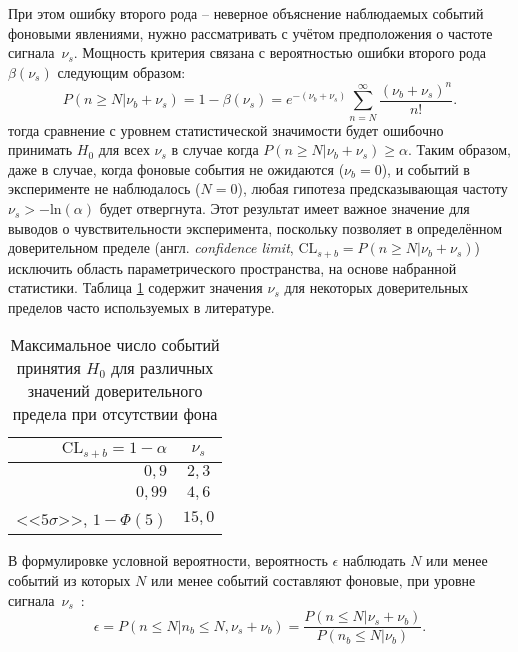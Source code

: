 При этом ошибку второго рода -- %
неверное объяснение наблюдаемых событий фоновыми явлениями,
нужно рассматривать с учётом предположения о частоте
сигнала~$\nu_s$. Мощность критерия связана с вероятностью ошибки
второго рода $\beta(\nu_s)$ следующим образом:
\begin{equation}
    P(n \ge N|\nu_b + \nu_s)
        = 1 - \beta(\nu_s) = e^{-(\nu_b + \nu_s)} \sum\limits_{n=N}^{\infty} \frac{(\nu_b + \nu_s)^n}{n!}.
\end{equation}
тогда сравнение с уровнем статистической значимости 
будет ошибочно принимать $H_0$ для всех $\nu_s$ в случае
когда $P(n \ge N|\nu_b + \nu_s)\ge\alpha$. Таким образом, даже
в случае, когда фоновые события не ожидаются ($\nu_b = 0$),
и событий в эксперименте не наблюдалось ($N=0$),
любая гипотеза предсказывающая частоту $\nu_s > -\text{ln}(\alpha)$
будет отвергнута. Этот результат имеет важное значение для
выводов о чувствительности эксперимента, поскольку позволяет
в определённом доверительном пределе (англ. \emph{confidence limit},
$\text{CL}_{s+b} = P(n \ge N|\nu_b + \nu_s)$)
исключить область параметрического пространства, на основе
набранной статистики. Таблица \ref{tab:cls-alpha-examples}
содержит значения $\nu_s$ для некоторых доверительных пределов часто
используемых в литературе.

\begin{table}[ht]
    \centering
    \begin{tabular}{r|c}
        $\text{CL}_{s+b} = 1 - \alpha$ & $\nu_s$ \\ \hline
        $0{,}9$ & $2{,}3$ \\
        $0{,}99$ & $4{,}6$ \\
        <<$5 \sigma$>>, $ 1 - \Phi(5)$ & $15{,}0$
    \end{tabular}
    \caption{Максимальное число событий принятия $H_0$ для
    различных значений доверительного предела при отсутствии
    фона}
    \label{tab:cls-alpha-examples}
\end{table}

В формулировке условной вероятности,
вероятность $\epsilon$ наблюдать $N$ или менее событий из
которых $N$ или менее событий составляют фоновые, при уровне
сигнала~$\nu_s$~\cite{cls-mtd-zech}:
\begin{equation}
    \epsilon =P(n \le N | n_b \le N, \nu_s + \nu_b) = \frac{P(n \le N | \nu_s +\nu_b)}{P(n_b \le N | \nu_b)}.
    \label{eq:cls-cond-prob}
\end{equation}

